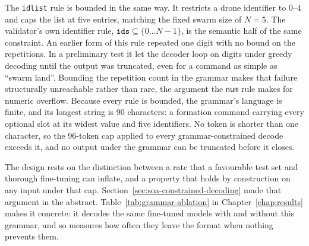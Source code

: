 The \texttt{idlist} rule is bounded in the same way. It restricts a drone identifier to $0$--$4$
and caps the list at five entries, matching the fixed swarm size of $N = 5$. The validator's own
identifier rule, $\mathtt{ids} \subseteq \{0 \dots N{-}1\}$, is the semantic half of the same
constraint. An earlier form of this rule repeated one digit with no bound on the repetitions. In a
preliminary test it let the decoder loop on digits under greedy decoding until the output was
truncated, even for a command as simple as ``swarm land''. Bounding the repetition count in the
grammar makes that failure structurally unreachable rather than rare, the argument the \texttt{num}
rule makes for numeric overflow. Because every rule is bounded, the grammar's language is finite,
and its longest string is 90 characters: a formation command carrying every optional slot at its
widest value and five identifiers. No token is shorter than one character, so the 96-token cap
applied to every grammar-constrained decode exceeds it, and no output under the grammar can be
truncated before it closes.

The design rests on the distinction between a rate that a favourable test set and thorough
fine-tuning can inflate, and a property that holds by construction on any input under that cap.
Section~\ref{sec:soa-constrained-decoding} made that argument in the abstract.
Table~\ref{tab:grammar-ablation} in Chapter~\ref{chap:results} makes it concrete: it decodes the
same fine-tuned models with and without this grammar, and so measures how often they leave the
format when nothing prevents them.


